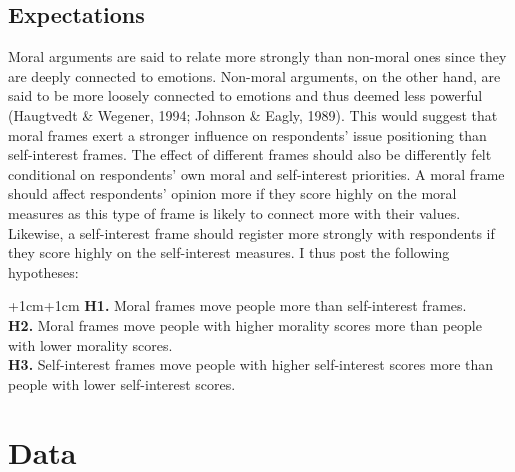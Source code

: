 \documentclass[12pt,econ]{sources/authesis}
\begin{document}
\hypertarget{framing-design-expectations}{%
\subsection{Expectations}\label{framing-design-expectations}}

Moral arguments are said to relate more strongly than non-moral ones since they are deeply connected to emotions. Non-moral arguments, on the other hand, are said to be more loosely connected to emotions and thus deemed less powerful (Haugtvedt \& Wegener, 1994; Johnson \& Eagly, 1989). This would suggest that moral frames exert a stronger influence on respondents' issue positioning than self-interest frames. The effect of different frames should also be differently felt conditional on respondents' own moral and self-interest priorities. A moral frame should affect respondents' opinion more if they score highly on the moral measures as this type of frame is likely to connect more with their values. Likewise, a self-interest frame should register more strongly with respondents if they score highly on the self-interest measures. I thus post the following hypotheses:

\vspace{0.3cm}
\begin{adjustwidth*}{+1cm}{+1cm}
\noindent \textbf{H1.} Moral frames move people more than self-interest frames.\\
\noindent \textbf{H2.} Moral frames move people with higher morality scores more than people with lower morality scores.\\
\noindent \textbf{H3.} Self-interest frames move people with higher self-interest scores more than people with lower self-interest scores.\\
\end{adjustwidth*}
\hypertarget{framing-data}{%
\section{Data}\label{framing-data}}
\end{document}
